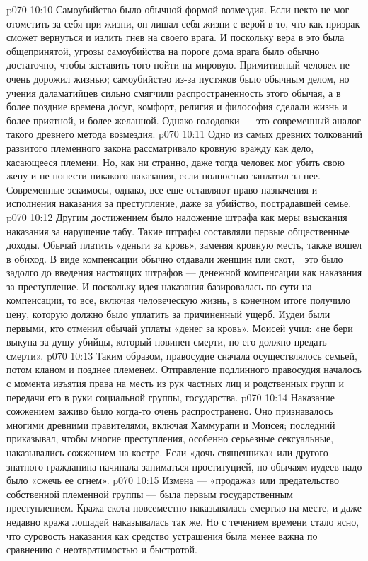 \vs p070 10:10 Самоубийство было обычной формой возмездия. Если некто не мог отомстить за себя при жизни, он лишал себя жизни с верой в то, что как призрак сможет вернуться и излить гнев на своего врага. И поскольку вера в это была общепринятой, угрозы самоубийства на пороге дома врага было обычно достаточно, чтобы заставить того пойти на мировую. Примитивный человек не очень дорожил жизнью; самоубийство из\hyp{}за пустяков было обычным делом, но учения даламатийцев сильно смягчили распространенность этого обычая, а в более поздние времена досуг, комфорт, религия и философия сделали жизнь и более приятной, и более желанной. Однако голодовки --- это современный аналог такого древнего метода возмездия.
\vs p070 10:11 Одно из самых древних толкований развитого племенного закона рассматривало кровную вражду как дело, касающееся племени. Но, как ни странно, даже тогда человек мог убить свою жену и не понести никакого наказания, если полностью заплатил за нее. Современные эскимосы, однако, все еще оставляют право назначения и исполнения наказания за преступление, даже за убийство, пострадавшей семье.
\vs p070 10:12 Другим достижением было наложение штрафа как меры взыскания наказания за нарушение табу. Такие штрафы составляли первые общественные доходы. Обычай платить «деньги за кровь», заменяя кровную месть, также вошел в обиход. В виде компенсации обычно отдавали женщин или скот,　это было задолго до введения настоящих штрафов --- денежной компенсации как наказания за преступление. И поскольку идея наказания базировалась по сути на компенсации, то все, включая человеческую жизнь, в конечном итоге получило цену, которую должно было уплатить за причиненный ущерб. Иудеи были первыми, кто отменил обычай уплаты «денег за кровь». Моисей учил: «не бери выкупа за душу убийцы, который повинен смерти, но его должно предать смерти».
\vs p070 10:13 \pc Таким образом, правосудие сначала осуществлялось семьей, потом кланом и позднее племенем. Отправление подлинного правосудия началось с момента изъятия права на месть из рук частных лиц и родственных групп и передачи его в руки социальной группы, государства.
\vs p070 10:14 \pc Наказание сожжением заживо было когда\hyp{}то очень распространено. Оно признавалось многими древними правителями, включая Хаммурапи и Моисея; последний приказывал, чтобы многие преступления, особенно серьезные сексуальные, наказывались сожжением на костре. Если «дочь священника» или другого знатного гражданина начинала заниматься проституцией, по обычаям иудеев надо было «сжечь ее огнем».
\vs p070 10:15 Измена --- «продажа» или предательство собственной племенной группы --- была первым государственным преступлением. Кража скота повсеместно наказывалась смертью на месте, и даже недавно кража лошадей наказывалась так же. Но с течением времени стало ясно, что суровость наказания как средство устрашения была менее важна по сравнению с неотвратимостью и быстротой.
